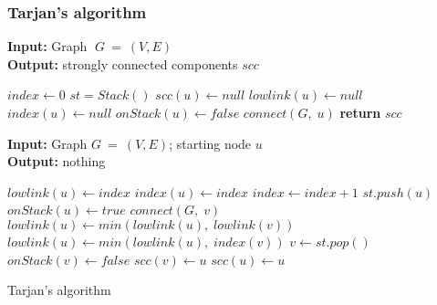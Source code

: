\documentclass{article}
\begin{document}
\subsubsection{Tarjan's algorithm}
\begin{algorithm}[ht]
\begin{minipage}[t]{0.48\textwidth}
\textbf{Input:} Graph $\;G\:=\:(V, E)$\\
\textbf{Output:} strongly connected components $scc$
\begin{algorithmic}[1]
    \State $index \gets 0$ 
    \State $st = Stack()$
            \State $scc(u) \gets null$
            \State $lowlink(u) \gets null$
            \State $index(u) \gets null$
            \State $onStack(u) \gets false$
        \EndFor
                \State $connect(G,\; u)$
            \EndIf
        \EndFor
    \State \textbf{return} $scc$
    \EndFunction
\end{algorithmic}
\end{minipage}
\hfill
\begin{minipage}[t]{0.52\textwidth}
\textbf{Input:} Graph $G\:=\:(V, E)$; starting node $u$\\
\textbf{Output:} nothing
\begin{algorithmic}[1]
        \State $lowlink(u) \gets index$
        \State $index(u) \gets index$
        \State $index \gets index + 1$
        \State $st.push(u)$
        \State $onStack(u) \gets true$
                \State $connect(G,\; v)$
                \State $lowlink(u) \gets min(lowlink(u),\;lowlink(v))$
                \State $lowlink(u) \gets min(lowlink(u),\;index(v))$
            \EndIf
        \EndFor
            \Do
                \State $v \gets st.pop()\;$
                \State $onStack(v) \gets false$
                \State $scc(v) \gets u$
            \State $scc(u)\gets u$
        \EndIf
    \EndFunction
\end{algorithmic}
\end{minipage}
\caption{Tarjan's algorithm}
\end{algorithm}
\end{document}

